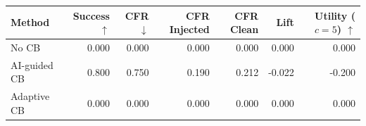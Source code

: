 \begin{tabular}{lrrrrrr}
\toprule
Method & Success $\uparrow$ & CFR $\downarrow$ & CFR Injected & CFR Clean & Lift & Utility ($c=5$) $\uparrow$ \\
\midrule
No CB & 0.000 & 0.000 & 0.000 & 0.000 & 0.000 & 0.000 \\
AI-guided CB & 0.800 & 0.750 & 0.190 & 0.212 & -0.022 & -0.200 \\
Adaptive CB & 0.000 & 0.000 & 0.000 & 0.000 & 0.000 & 0.000 \\
\bottomrule
\end{tabular}
